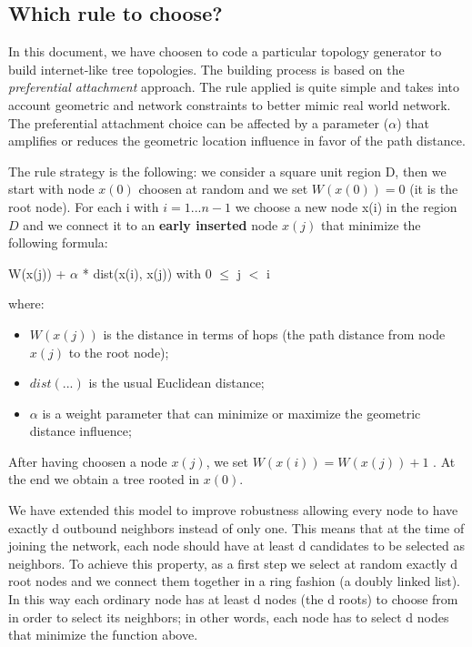 \documentclass[a4paper,12pt]{article}
\begin{document}
\subsection{Which rule to choose?}

In this document, we have choosen to code a particular topology generator
to build internet-like tree topologies. The building process is based
on the \emph{preferential attachment} approach. The rule applied is
quite simple and takes into account geometric and network constraints
to better mimic real world network. The preferential attachment choice
can be affected by a parameter ($\alpha$) that amplifies or reduces the
geometric location influence in favor of the path distance. 

The rule strategy is the following: we consider a square unit region
D, then we start with node $x(0)$ choosen at random and we set $W(x(0))
= 0$ (it is the root node). For each i with $i = 1...n-1$ we choose a
new node x(i) in the region $D$ and we connect it to an \textbf{early
inserted} node $x(j)$ that minimize the following formula:

\begin{center}

W(x(j)) + $\alpha$ {*} dist(x(i), x(j)) with 0 $\leq$ j $<$ i
\end{center}

where: 

\begin{itemize}
\item $W(x(j))$ is the distance in terms of hops (the path distance from node
$x(j)$ to the root node); 
\item $dist(...)$ is the usual Euclidean distance; 
\item $\alpha$ is a weight parameter that can minimize or maximize 
the geometric distance influence;
 
\end{itemize}

After having choosen a node $x(j)$, we set $W(x(i)) = W(x(j))+1$ . At
the end we obtain a tree rooted in $x(0)$.

We have extended this model to improve robustness allowing every node
to have exactly d outbound neighbors instead of only one. This means
that at the time of joining the network, each node should have at
least d candidates to be selected as neighbors. To achieve this property,
as a first step we select at random exactly d root nodes and we connect
them together in a ring fashion (a doubly linked list). In this way
each ordinary node has at least d nodes (the d roots) to choose from
in order to select its neighbors; in other words, each node has to
select d nodes that minimize the function above. 
\end{document}
